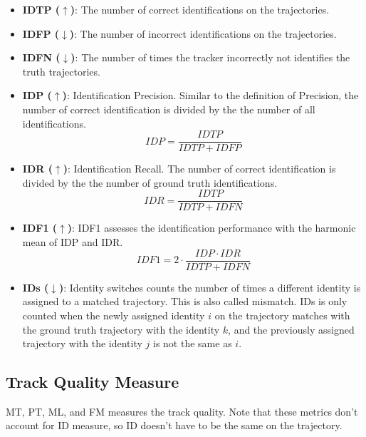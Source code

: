\begin{itemize}

\item \textbf{IDTP ($\uparrow$)}: The number of correct identifications on the trajectories.

\item \textbf{IDFP ($\downarrow$)}: The number of incorrect identifications on the trajectories.

\item \textbf{IDFN ($\downarrow$)}: The number of times the tracker incorrectly not identifies the truth trajectories.

\item \textbf{IDP ($\uparrow$)}: Identification Precision. Similar to the definition of Precision, the number of correct identification is divided by the the number of all identifications.
\begin{equation}
IDP = \frac{IDTP}{IDTP + IDFP}
\label{eqn:IDP}
\end{equation}

\item \textbf{IDR ($\uparrow$)}: Identification Recall. The number of correct identification is divided by the the number of ground truth identifications.
\begin{equation}
IDR = \frac{IDTP}{IDTP + IDFN}
\label{eqn:IDR}
\end{equation}

\item \textbf{IDF1 ($\uparrow$)}: IDF1 assesses the identification performance with the harmonic mean of IDP and IDR. 
\begin{equation}
IDF1 = 2 \cdot \frac{IDP \cdot IDR}{IDTP + IDFN}
\label{eqn:IDF1}
\end{equation}

\item \textbf{IDs ($\downarrow$)}: Identity switches counts the number of times a different identity is assigned to a matched trajectory. This is also called mismatch. IDs is only counted when the newly assigned identity $\textit{i}$ on the trajectory matches with the ground truth trajectory with the identity $\textit{k}$, and the previously assigned trajectory with the identity $\textit{j}$ is not the same as $\textit{i}$.
\end{itemize}



\subsection{Track Quality Measure}
MT, PT, ML, and FM measures the track quality. Note that these metrics don't account for ID measure, so ID doesn't have to be the same on the trajectory.

